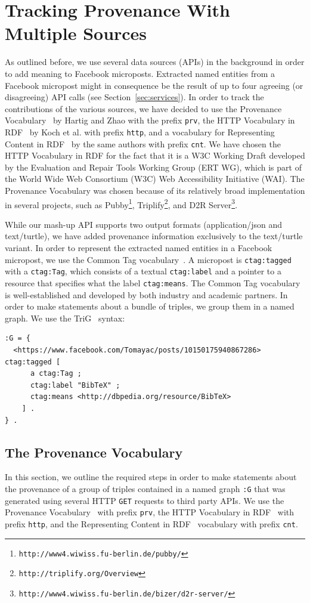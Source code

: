 \documentclass[twocolumn]{article}
\begin{document}
\section{Tracking Provenance With Multiple Sources}                    \label{sec:tracking}
As outlined before, we use several data sources (APIs) in the background in order to add meaning to Facebook microposts. Extracted named entities from a Facebook micropost might in consequence be the result of up to four agreeing (or disagreeing) API calls (see Section~\ref{sec:services}). In order to track the contributions of the various sources, we have decided to use the Provenance Vocabulary~\cite{Hartig:Provenance} by Hartig and Zhao with the prefix \texttt{prv}, the HTTP Vocabulary in RDF~\cite{HTTP:RDF} by Koch et al. with prefix \texttt{http}, and a vocabulary for Representing Content in RDF~\cite{CNT:RDF} by the same authors with prefix \texttt{cnt}. We have chosen the HTTP Vocabulary in RDF for the fact that it is a W3C Working Draft  developed by the Evaluation and Repair Tools Working Group (ERT WG), which is part of the World Wide Web Consortium (W3C) Web Accessibility Initiative (WAI). The Provenance Vocabulary was chosen because of its relatively broad implementation in several projects, such as Pubby\footnote{\texttt{http://www4.wiwiss.fu-berlin.de/pubby/}}, Triplify\footnote{\texttt{http://triplify.org/Overview}}, and D2R Server\footnote{\texttt{http://www4.wiwiss.fu-berlin.de/bizer/d2r-server/}}.

While our mash-up API supports two output formats (application/json and text/turtle), we have added provenance information exclusively to the text/turtle variant. In order to represent the extracted named entities in a Facebook micropost, we use the Common Tag vocabulary~\cite{CommonTag:Spec}. A micropost is \texttt{ctag:tagged} with a \texttt{ctag:Tag}, which consists of a textual \texttt{ctag:label} and a pointer to a resource that specifies what the label \texttt{ctag:means}. The Common Tag vocabulary is well-established and developed by both industry and academic partners. In order to make statements about a bundle of triples, we group them in a named graph. We use the TriG~\cite{Bizer:TriG} syntax:
\begin{lstlisting}
:G = {
  <https://www.facebook.com/Tomayac/posts/10150175940867286> ctag:tagged [
      a ctag:Tag ;
      ctag:label "BibTeX" ;
      ctag:means <http://dbpedia.org/resource/BibTeX>
    ] .
} .
\end{lstlisting}

\subsection{The Provenance Vocabulary}                                      \label{sec:provenance}
In this section, we outline the required steps in order to make statements about the provenance of a group of triples contained in a named graph \texttt{:G} that was generated using several HTTP \texttt{GET} requests to third party APIs. We use the Provenance Vocabulary~\cite{Hartig:Provenance} with prefix \texttt{prv}, the HTTP Vocabulary in RDF~\cite{HTTP:RDF} with prefix \texttt{http}, and the Representing Content in RDF~\cite{CNT:RDF} vocabulary with prefix \texttt{cnt}.
\end{document}
